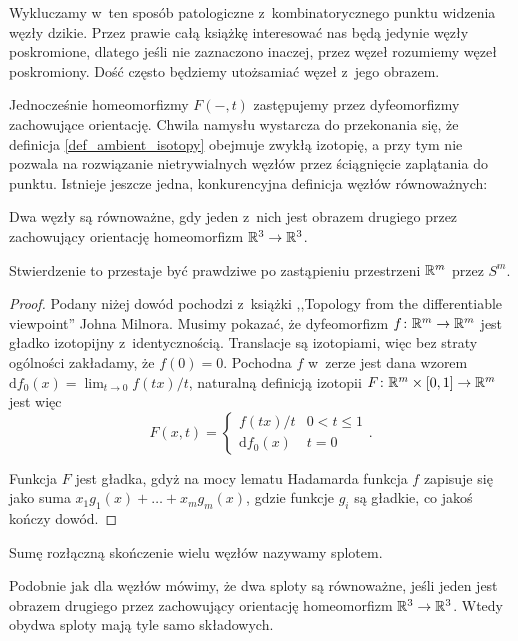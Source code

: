Wykluczamy w~ten sposób patologiczne z~kombinatorycznego punktu widzenia węzły dzikie.
Przez prawie całą książkę interesować nas będą jedynie węzły poskromione,
dlatego jeśli nie zaznaczono inaczej, przez węzeł rozumiemy węzeł poskromiony.
Dość często będziemy utożsamiać węzeł z~jego obrazem.

Jednocześnie homeomorfizmy $F(-,t)$ zastępujemy przez dyfeomorfizmy zachowujące orientację.
Chwila namysłu wystarcza do przekonania się, że definicja \ref{def_ambient_isotopy} obejmuje zwykłą izotopię,
a przy tym nie pozwala na rozwiązanie nietrywialnych węzłów przez ściągnięcie zaplątania do punktu.
Istnieje jeszcze jedna, konkurencyjna definicja węzłów równoważnych:

\begin{definition}
    Dwa węzły są równoważne, gdy jeden z~nich jest obrazem drugiego przez zachowujący orientację homeomorfizm $\mathbb R^3 \to \mathbb R^3$.
\end{definition}

Stwierdzenie to przestaje być prawdziwe po zastąpieniu przestrzeni $\mathbb R^m$ przez $S^m$.

\begin{proof}
    Podany niżej dowód pochodzi z~książki ,,Topology from the differentiable viewpoint'' Johna Milnora.
    Musimy pokazać, że dyfeomorfizm $f \colon \mathbb R^m \to \mathbb R^m$ jest gładko izotopijny z~identycznością.
    Translacje są izotopiami, więc bez straty ogólności zakładamy, że $f(0) = 0$.
    Pochodna $f$ w~zerze jest dana wzorem $\mathrm{d}f_0(x) = \lim_{t \to 0} f(tx) /t$,
    naturalną definicją    izotopii $F \colon \mathbb R^m \times [0, 1] \to \mathbb R^m$ jest więc
    \[
        F(x, t) = \begin{cases}
            f(tx) / t & 0 < t \le 1 \\
            \mathrm{d}f_0(x) & t = 0
        \end{cases} .
    \]

    Funkcja $F$ jest gładka,
    gdyż na mocy lematu Hadamarda funkcja $f$ zapisuje się jako suma $x_1 g_1(x) + \ldots + x_mg_m(x)$,
    gdzie funkcje $g_i$ są gładkie, co jakoś kończy dowód.
\end{proof}

\begin{definition}[splot]
    \label{def_link}
    Sumę rozłączną skończenie wielu węzłów nazywamy splotem.
\end{definition}

Podobnie jak dla węzłów mówimy, że dwa sploty są równoważne, jeśli jeden jest obrazem drugiego przez zachowujący orientację homeomorfizm $\mathbb R^3 \to \mathbb R^3$.
Wtedy obydwa sploty mają tyle samo składowych.

